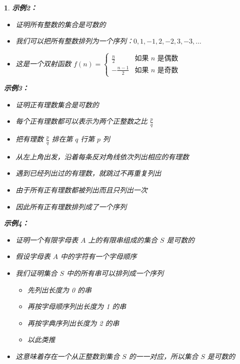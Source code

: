 \documentclass[UTF8]{report}
\theoremstyle{MyLineTheoremStyle} %
\theoremstyle{MyBlockTheoremStyle} %
\theoremstyle{MySubsubsectionStyle} %
\newtheorem{definition}{}
\begin{document}
\begin{definition}
    \textbf{示例2：}\par
    \begin{itemize}
        \item 证明所有整数的集合是可数的
        \item 我们可以把所有整数排列为一个序列：$0, 1, -1, 2, -2, 3, -3, \ldots$
        \item 这是一个双射函数 $f(n) = \begin{cases} 
            \frac{n}{2} & \text{如果 } n \text{ 是偶数} \\
            -\frac{n-1}{2} & \text{如果 } n \text{ 是奇数}
        \end{cases}$
    \end{itemize}

    \textbf{示例3：}\par
    \begin{itemize}
        \item 证明正有理数集合是可数的
        \item 每个正有理数都可以表示为两个正整数之比 $\frac{p}{q}$
        \item 把有理数 $\frac{p}{q}$ 排在第 $q$ 行第 $p$ 列
        \item 从左上角出发，沿着每条反对角线依次列出相应的有理数
        \item 遇到已经列出过的有理数，就跳过不再重复列出
        \item 由于所有正有理数都被列出而且只列出一次
        \item 因此所有正有理数排列成了一个序列
    \end{itemize}

    \textbf{示例4：}\par
    \begin{itemize}
        \item 证明一个有限字母表 $A$ 上的有限串组成的集合 $S$ 是可数的
        \item 假设字母表 $A$ 中的字符有一个字母顺序
        \item 我们证明集合 $S$ 中的所有串可以排列成一个序列
        \begin{itemize}
            \item 先列出长度为 0 的串
            \item 再按字母顺序列出长度为 1 的串
            \item 再按字典序列出长度为 2 的串
            \item 以此类推
        \end{itemize}
        \item 这意味着存在一个从正整数到集合 $S$ 的一一对应，所以集合 $S$ 是可数的
    \end{itemize}


\end{definition}
\end{document}
